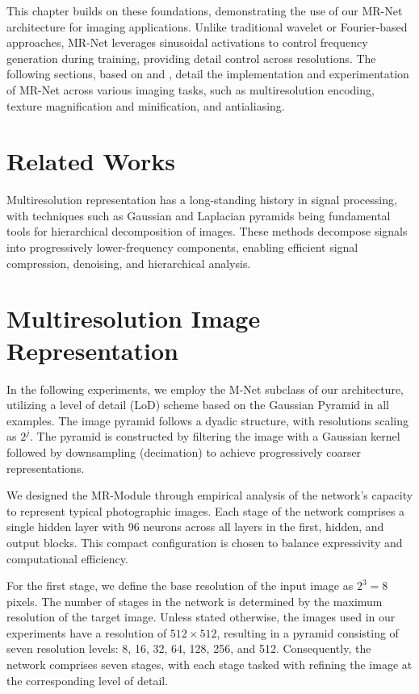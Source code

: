 This chapter builds on these foundations, demonstrating the use of our MR-Net architecture for imaging applications. Unlike traditional wavelet or Fourier-based approaches, MR-Net leverages sinusoidal activations to control frequency generation during training, providing detail control across resolutions. The following sections, based on \citet{paz2022} and \citet{paz2023mr}, detail the implementation and experimentation of MR-Net across various imaging tasks, such as multiresolution encoding, texture magnification and minification, and antialiasing.

\section{Related Works}

Multiresolution representation has a long-standing history in signal processing, with techniques such as Gaussian and Laplacian pyramids \citep{burt1987laplacian} being fundamental tools for hierarchical decomposition of images. These methods decompose signals into progressively lower-frequency components, enabling efficient signal compression, denoising, and hierarchical analysis.


\section{Multiresolution Image Representation}
\label{s:img}


In the following experiments, we employ the M-Net subclass of our architecture, utilizing a level of detail (LoD) scheme based on the Gaussian Pyramid in all examples. The image pyramid follows a dyadic structure, with resolutions scaling as \( 2^j \). The pyramid is constructed by filtering the image with a Gaussian kernel followed by downsampling (decimation) to achieve progressively coarser representations.

We designed the MR-Module through empirical analysis of the network's capacity to represent typical photographic images. Each stage of the network comprises a single hidden layer with 96 neurons across all layers in the first, hidden, and output blocks. This compact configuration is chosen to balance expressivity and computational efficiency.  

For the first stage, we define the base resolution of the input image as \( 2^3 = 8 \) pixels. The number of stages in the network is determined by the maximum resolution of the target image. Unless stated otherwise, the images used in our experiments have a resolution of \(512 \times 512\), resulting in a pyramid consisting of seven resolution levels: 8, 16, 32, 64, 128, 256, and 512. Consequently, the network comprises seven stages, with each stage tasked with refining the image at the corresponding level of detail.

